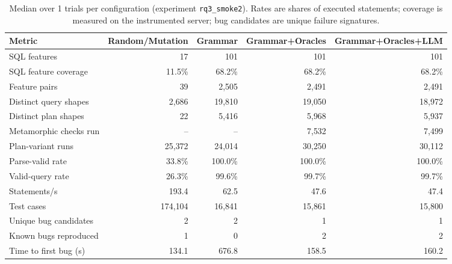 \begin{table}[t]
  \caption{Median over 1 trials per configuration (experiment \texttt{rq3\_smoke2}). Rates are shares of executed statements; coverage is measured on the instrumented server; bug candidates are unique failure signatures.}
  \label{tab:rq3-smoke2-summary}
  \footnotesize
  \begin{tabular}{lrrrr}
    \toprule
    Metric & Random/Mutation & Grammar & Grammar+Oracles & Grammar+Oracles+LLM \\
    \midrule
    SQL features & 17 & 101 & 101 & 101 \\
    SQL feature coverage & 11.5\% & 68.2\% & 68.2\% & 68.2\% \\
    Feature pairs & 39 & 2{,}505 & 2{,}491 & 2{,}491 \\
    Distinct query shapes & 2{,}686 & 19{,}810 & 19{,}050 & 18{,}972 \\
    Distinct plan shapes & 22 & 5{,}416 & 5{,}968 & 5{,}937 \\
    Metamorphic checks run & -- & -- & 7{,}532 & 7{,}499 \\
    Plan-variant runs & 25{,}372 & 24{,}014 & 30{,}250 & 30{,}112 \\
    Parse-valid rate & 33.8\% & 100.0\% & 100.0\% & 100.0\% \\
    Valid-query rate & 26.3\% & 99.6\% & 99.7\% & 99.7\% \\
    Statements/s & 193.4 & 62.5 & 47.6 & 47.4 \\
    Test cases & 174{,}104 & 16{,}841 & 15{,}861 & 15{,}800 \\
    Unique bug candidates & 2 & 2 & 1 & 1 \\
    Known bugs reproduced & 1 & 0 & 2 & 2 \\
    Time to first bug (s) & 134.1 & 676.8 & 158.5 & 160.2 \\
    \bottomrule
  \end{tabular}
\end{table}
